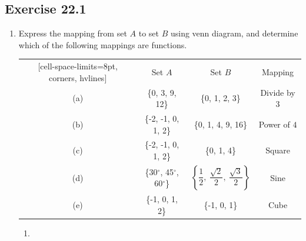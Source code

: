 \documentclass[12pt]{report}
\begin{document}
\newpage

\subsection{Exercise 22.1}

\begin{enumerate}
      \item Express the mapping from set $A$ to set $B$ using venn diagram, and determine
            which of the following mappings are functions.

            \begin{center}
                  \begin{NiceTabular}{|c|c|c|c|}[cell-space-limits=8pt, corners, hvlines]
                            & Set $A$                                & Set $B$                                                                   & Mapping       \\
                        (a) & \{0, 3, 9, 12\}                        & \{0, 1, 2, 3\}                                                            & Divide by $3$ \\
                        (b) & \{-2, -1, 0, 1, 2\}                    & \{0, 1, 4, 9, 16\}                                                        & Power of $4$  \\
                        (c) & \{-2, -1, 0, 1, 2\}                    & \{0, 1, 4\}                                                               & Square        \\
                        (d) & \{30$^\circ$, 45$^\circ$, 60$^\circ$\} & $\left\{\dfrac{1}{2},\ \dfrac{\sqrt{2}}{2},\ \dfrac{\sqrt{3}}{2}\right\}$ & Sine          \\
                        (e) & \{-1, 0, 1, 2\}                        & \{-1, 0, 1\}                                                              & Cube          \\
                  \end{NiceTabular}
            \end{center}

            \sol{}

            \setlength{\columnseprule}{1pt}
            \setlength{\columnsep}{24pt}

            \begin{multicols}{2}

                  \begin{enumerate}[label=(\alph*)]
                        \item {}
\end{enumerate}
\end{multicols}
\end{enumerate}
\end{document}
